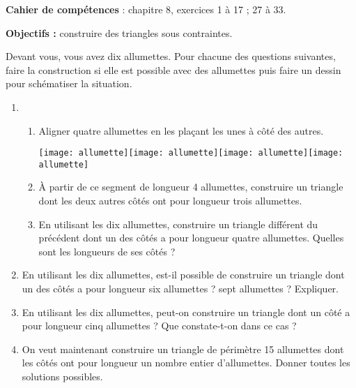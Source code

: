 \vfill

\textcolor{PartieGeometrie}{\sffamily\bfseries Cahier de compétences} : chapitre 8, exercices 1 à 17 ; 27 à 33.


\activites

\begin{activite}
   {\bf Objectifs :} construire des triangles sous contraintes.
   \begin{QCM}
      Devant vous, vous avez dix allumettes. Pour chacune des questions suivantes, faire la construction si elle est possible avec des allumettes puis faire un dessin pour schématiser la situation.
      \begin{enumerate}
         \item
         \begin{enumerate}
            \item Aligner quatre allumettes en les plaçant les unes à côté des autres.
            \bigskip
            \begin{center}
               \texttt{[image: allumette]}\texttt{[image: allumette]}\texttt{[image: allumette]}\texttt{[image: allumette]}
            \end{center}
            \bigskip
            \item À partir de ce segment de longueur 4 allumettes, construire un triangle dont les deux autres côtés ont pour longueur trois allumettes. \\ [2cm]
            \item En utilisant les dix allumettes, construire un triangle différent du précédent dont un des côtés a pour longueur quatre allumettes. Quelles sont les longueurs de ses côtés ? \\ [2cm]
         \end{enumerate}
         \item En utilisant les dix allumettes, est-il possible de construire un triangle dont un des côtés a pour longueur six allumettes ? sept allumettes ? Expliquer. \\ [2cm]
         \item En utilisant les dix allumettes, peut-on construire un triangle dont un côté a pour longueur cinq allumettes ? Que constate-t-on dans ce cas ? \\ [2cm]
         \item On veut maintenant construire un triangle de périmètre 15 allumettes dont les côtés ont pour longueur un nombre entier d'allumettes. Donner toutes les solutions possibles. \\ [2cm]
      \end{enumerate}
   \end{QCM}
\end{activite}


